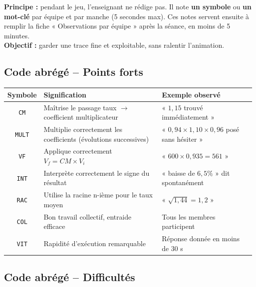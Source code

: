 \documentclass[12pt,a4paper]{article}
\begin{document}
\begin{regle}
	\textbf{Principe :} pendant le jeu, l'enseignant ne rédige pas. Il note \textbf{un symbole} ou \textbf{un mot-clé} par équipe et par manche (5 secondes max). Ces notes servent ensuite à remplir la fiche « Observations par équipe » après la séance, en moins de 5 minutes.\\[0.2cm]
	\textbf{Objectif :} garder une trace fine et exploitable, sans ralentir l'animation.
\end{regle}

\vspace{0.3cm}

\subsection*{Code abrégé -- Points forts}

\begin{center}
	\renewcommand{\arraystretch}{1.4}
	\begin{tabular}{|c|>{\raggedright\arraybackslash}p{6cm}|>{\raggedright\arraybackslash}p{7.5cm}|}
		\hline
		\textbf{Symbole} & \textbf{Signification} & \textbf{Exemple observé} \\
		\hline
		\texttt{CM} & Maîtrise le passage taux \(\to\) coefficient multiplicateur & « \(1{,}15\) trouvé immédiatement » \\
		\hline
		\texttt{MULT} & Multiplie correctement les coefficients (évolutions successives) & « \(0{,}94 \times 1{,}10 \times 0{,}96\) posé sans hésiter » \\
		\hline
		\texttt{VF} & Applique correctement \(V_f = CM \times V_i\) & « \(600 \times 0{,}935 = 561\) » \\
		\hline
		\texttt{INT} & Interprète correctement le signe du résultat & « baisse de \(6{,}5\%\) » dit spontanément \\
		\hline
		\texttt{RAC} & Utilise la racine n-ième pour le taux moyen & « \(\sqrt{1{,}44} = 1{,}2\) » \\
		\hline
		\texttt{COL} & Bon travail collectif, entraide efficace & Tous les membres participent \\
		\hline
		\texttt{VIT} & Rapidité d'exécution remarquable & Réponse donnée en moins de 30 s \\
		\hline
	\end{tabular}
\end{center}

\vspace{0.4cm}

\subsection*{Code abrégé -- Difficultés}
\end{document}
